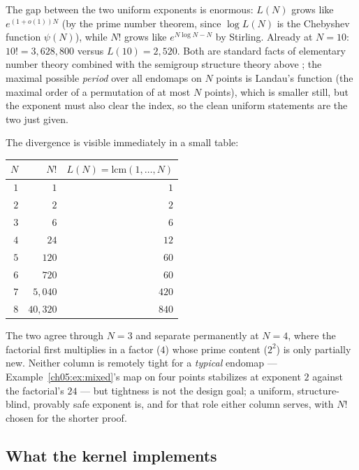 The gap between the two uniform exponents is enormous: $L(N)$ grows like
$e^{(1 + o(1)) N}$ (by the prime number theorem, since $\log L(N)$ is the
Chebyshev function $\psi(N)$), while $N!$ grows like $e^{N \log N - N}$
by Stirling. Already at $N = 10$: $10! = 3{,}628{,}800$ versus
$L(10) = 2{,}520$. Both are standard facts of elementary number theory
combined with the semigroup structure theory above \cite{pin, howie}; the
maximal possible \emph{period} over all endomaps on $N$ points is Landau's
function (the maximal order of a permutation of at most $N$ points), which
is smaller still, but the exponent must also clear the index, so the clean
uniform statements are the two just given.

The divergence is visible immediately in a small table:

\begin{center}
\begin{tabular}{@{}rrr@{}}
\toprule
$N$ & $N!$ & $L(N) = \mathrm{lcm}(1, \dots, N)$ \\
\midrule
$1$ & $1$ & $1$ \\
$2$ & $2$ & $2$ \\
$3$ & $6$ & $6$ \\
$4$ & $24$ & $12$ \\
$5$ & $120$ & $60$ \\
$6$ & $720$ & $60$ \\
$7$ & $5{,}040$ & $420$ \\
$8$ & $40{,}320$ & $840$ \\
\bottomrule
\end{tabular}
\end{center}

The two agree through $N = 3$ and separate permanently at $N = 4$, where
the factorial first multiplies in a factor ($4$) whose prime content
($2^2$) is only partially new. Neither column is remotely tight for a
\emph{typical} endomap --- Example~\ref{ch05:ex:mixed}'s map on four
points stabilizes at exponent $2$ against the factorial's $24$ --- but
tightness is not the design goal; a uniform, structure-blind, provably
safe exponent is, and for that role either column serves, with $N!$
chosen for the shorter proof.

\subsection{What the kernel implements}


